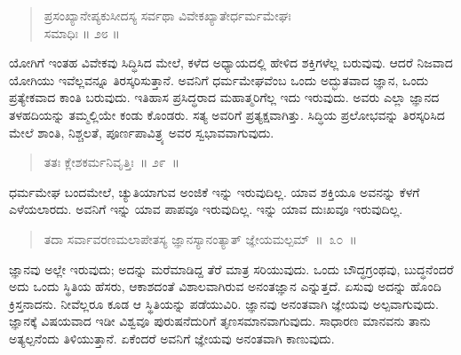 
\vspace{-0.3cm}

\begin{verse}
ಪ್ರಸಂಖ್ಯಾನೇಪ್ಯಕುಸೀದಸ್ಯ ಸರ್ವಥಾ ವಿವೇಕಖ್ಯಾತೇರ್ಧರ್ಮಮೇಘಃ \\
\hspace{6cm} ಸಮಾಧಿಃ ॥ ೨೮ ॥
\end{verse}

\vspace{-0.3cm}


ಯೋಗಿಗೆ ಇಂತಹ ವಿವೇಕವು ಸಿದ್ಧಿಸಿದ ಮೇಲೆ, ಕಳೆದ ಅಧ್ಯಾಯದಲ್ಲಿ ಹೇಳಿದ ಶಕ್ತಿಗಳೆಲ್ಲ ಬರುವುವು. ಆದರೆ ನಿಜವಾದ ಯೋಗಿಯು ಇವೆಲ್ಲವನ್ನೂ ತಿರಸ್ಕರಿಸುತ್ತಾನೆ. ಅವನಿಗೆ ಧರ್ಮಮೇಘವೆಂಬ ಒಂದು ಅದ್ಭುತವಾದ ಜ್ಞಾನ, ಒಂದು ಪ್ರತ್ಯೇಕವಾದ ಕಾಂತಿ ಬರುವುದು. ಇತಿಹಾಸ ಪ್ರಸಿದ್ಧರಾದ ಮಹಾತ್ಮರಿಗೆಲ್ಲ ಇದು ಇರುವುದು. ಅವರು ಎಲ್ಲಾ ಜ್ಞಾನದ ತಳಹದಿಯನ್ನು ತಮ್ಮಲ್ಲಿಯೇ ಕಂಡು ಕೊಂಡರು. ಸತ್ಯ ಅವರಿಗೆ ಪ್ರತ್ಯಕ್ಷವಾಗಿತ್ತು. ಸಿದ್ಧಿಯ ಪ್ರಲೋಭವನ್ನು ತಿರಸ್ಕರಿಸಿದ ಮೇಲೆ ಶಾಂತಿ, ನಿಶ್ಚಲತೆ, ಪೂರ್ಣಪಾವಿತ್ರ್ಯ ಅವರ ಸ್ವಭಾವವಾಗುವುದು. 

\vspace{-0.3cm}

\begin{verse}
ತತಃ ಕ್ಲೇಶಕರ್ಮನಿವೃತ್ತಿಃ~॥ ೨೯~॥
\end{verse}

\vspace{-0.3cm}


ಧರ್ಮಮೇಘ ಬಂದಮೇಲೆ, ಚ್ಯುತಿಯಾಗುವ ಅಂಜಿಕೆ ಇನ್ನು ಇರುವುದಿಲ್ಲ. ಯಾವ ಶಕ್ತಿಯೂ ಅವನನ್ನು ಕೆಳಗೆ ಎಳೆಯಲಾರದು. ಅವನಿಗೆ ಇನ್ನು ಯಾವ ಪಾಪವೂ ಇರುವುದಿಲ್ಲ. ಇನ್ನು ಯಾವ ದುಃಖವೂ ಇರುವುದಿಲ್ಲ. 

\eject

\begin{verse}
ತದಾ ಸರ್ವಾವರಣಮಲಾಪೇತಸ್ಯ ಜ್ಞಾನಸ್ಯಾನಂತ್ಯಾತ್​  ಜ್ಞೇಯಮಲ್ಪಮ್​~॥~೩೦~॥
\end{verse}

\vspace{-0.3cm}


ಜ್ಞಾನವು ಅಲ್ಲೇ ಇರುವುದು; ಅದನ್ನು ಮರೆಮಾಡಿದ್ದ ತೆರೆ ಮಾತ್ರ ಸರಿಯುವುದು. ಒಂದು ಬೌದ್ಧಗ್ರಂಥವು, ಬುದ್ಧನೆಂದರೆ ಅದು ಒಂದು ಸ್ಥಿತಿಯ ಹೆಸರು, ಆಕಾಶದಂತೆ ವಿಶಾಲವಾಗಿರುವ ಅನಂತಜ್ಞಾನ ಎನ್ನುತ್ತದೆ. ಏಸುವು ಅದನ್ನು ಹೊಂದಿ ಕ್ರಿಸ್ತನಾದನು. ನೀವೆಲ್ಲರೂ ಕೂಡ ಆ ಸ್ಥಿತಿಯನ್ನು ಪಡೆಯುವಿರಿ. ಜ್ಞಾನವು ಅನಂತವಾಗಿ ಜ್ಞೇಯವು ಅಲ್ಪವಾಗುವುದು. ಜ್ಞಾನಕ್ಕೆ ವಿಷಯವಾದ ಇಡೀ ವಿಶ್ವವೂ ಪುರುಷನೆದುರಿಗೆ ತೃಣಸಮಾನವಾಗುವುದು. ಸಾಧಾರಣ ಮಾನವನು ತಾನು ಅತ್ಯಲ್ಪನೆಂದು ತಿಳಿಯುತ್ತಾನೆ. ಏಕೆಂದರೆ ಅವನಿಗೆ ಜ್ಞೇಯವು ಅನಂತವಾಗಿ ಕಾಣುವುದು.

